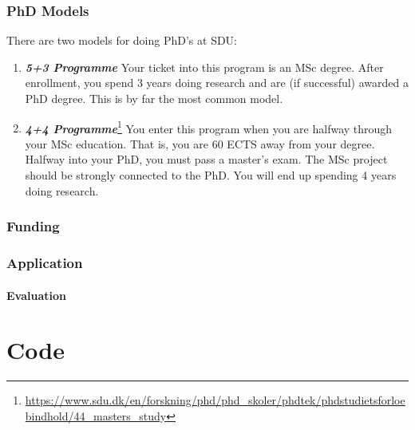 \documentclass[a4paper, oneside]{memoir}
\newcommand{\textdesc}[1]{\textit{\textbf{#1}}}
\newcommand{\descitem}[1]{\item \textdesc{#1}}
\begin{document}



\subsection{PhD Models}

There are two models for doing PhD's at SDU:
\begin{enumerate}
  \descitem{5+3 Programme} Your ticket into this program is an MSc degree. After enrollment, you spend 3 years doing research and are (if successful) awarded a PhD degree. This is by far the most common model.
  \descitem{4+4 Programme}\footnote{\url{https://www.sdu.dk/en/forskning/phd/phd_skoler/phdtek/phdstudietsforloebindhold/44_masters_study}} You enter this program when you are halfway through your MSc education. That is, you are 60 ECTS away from your degree. Halfway into your PhD, you must pass a master's exam. The MSc project should be strongly connected to the PhD. You will end up spending 4 years doing research.
\end{enumerate}

\subsection{Funding}




\subsection{Application}

\subsubsection{Evaluation}


\appendix







\chapter{Code}
\end{document}

